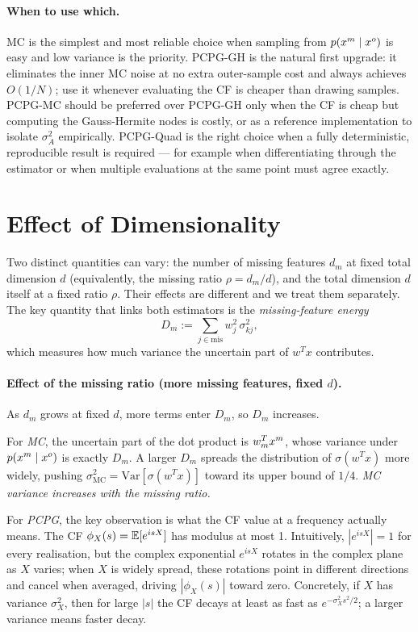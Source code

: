 \paragraph{When to use which.}
MC is the simplest and most reliable choice when sampling from $p(x^m \mid x^o)$
is easy and low variance is the priority.
PCPG-GH is the natural first upgrade: it eliminates the inner MC noise at no extra
outer-sample cost and always achieves $O(1/N)$; use it whenever evaluating the CF
is cheaper than drawing samples.
PCPG-MC should be preferred over PCPG-GH only when the CF is cheap but computing
the Gauss-Hermite nodes is costly, or as a reference implementation to isolate
$\sigma^2_A$ empirically.
PCPG-Quad is the right choice when a fully deterministic, reproducible result
is required --- for example when differentiating through the estimator or when
multiple evaluations at the same point must agree exactly.


\section{Effect of Dimensionality}
\label{sec:dimensionality}

Two distinct quantities can vary: the number of missing features $d_m$ at fixed
total dimension $d$ (equivalently, the missing ratio $\rho = d_m/d$), and the
total dimension $d$ itself at a fixed ratio $\rho$.
Their effects are different and we treat them separately.
The key quantity that links both estimators is the \emph{missing-feature energy}
\[
  D_m := \sum_{j \in \mathrm{mis}} w_j^2\,\sigma_{kj}^2,
\]
which measures how much variance the uncertain part of $w^T x$ contributes.

\paragraph{Effect of the missing ratio (more missing features, fixed $d$).}
As $d_m$ grows at fixed $d$, more terms enter $D_m$, so $D_m$ increases.

For \emph{MC}, the uncertain part of the dot product is $w_m^T x^m$, whose
variance under $p(x^m \mid x^o)$ is exactly $D_m$.
A larger $D_m$ spreads the distribution of $\sigma(w^T x)$ more widely, pushing
$\sigma^2_{\mathrm{MC}} = \mathrm{Var}[\sigma(w^T x)]$ toward its upper bound of
$1/4$.
\emph{MC variance increases with the missing ratio.}

For \emph{PCPG}, the key observation is what the CF value at a frequency actually
means.
The CF $\phi_X(s) = \mathbb{E}[e^{isX}]$ has modulus at most 1.
Intuitively, $|e^{isX}|=1$ for every realisation, but the complex exponential
$e^{isX}$ rotates in the complex plane as $X$ varies; when $X$ is widely spread,
these rotations point in different directions and cancel when averaged, driving
$|\phi_X(s)|$ toward zero.
Concretely, if $X$ has variance $\sigma^2_X$, then for large $|s|$ the CF decays
at least as fast as $e^{-\sigma^2_X s^2/2}$; a larger variance means faster decay.


